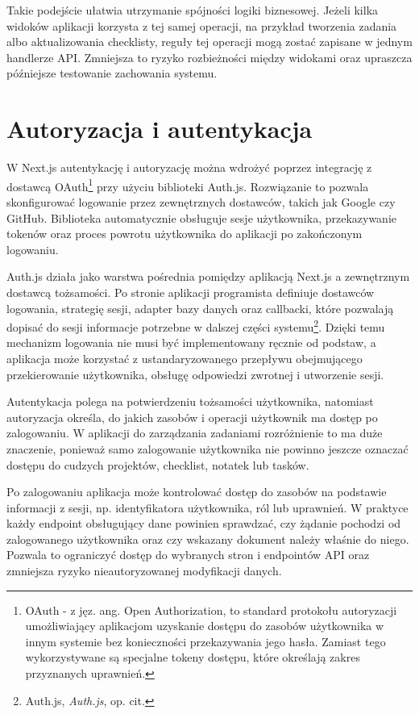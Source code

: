 \documentclass[12pt,a4paper,twoside]{report}
\newcommand{\FirstParagraph}{\noindent\ignorespaces}
\begin{document}
Takie podejście ułatwia utrzymanie spójności logiki biznesowej. Jeżeli kilka widoków aplikacji korzysta z tej samej operacji, na przykład tworzenia zadania albo aktualizowania checklisty, reguły tej operacji mogą zostać zapisane w jednym handlerze API. Zmniejsza to ryzyko rozbieżności między widokami oraz upraszcza późniejsze testowanie zachowania systemu.

\section{Autoryzacja i autentykacja}

\FirstParagraph W Next.js autentykację i autoryzację można wdrożyć poprzez integrację z dostawcą OAuth\footnote{OAuth - z jęz. ang. Open Authorization, to standard protokołu autoryzacji umożliwiający aplikacjom uzyskanie dostępu do zasobów użytkownika w innym systemie bez konieczności przekazywania jego hasła. Zamiast tego wykorzystywane są specjalne tokeny dostępu, które określają zakres przyznanych uprawnień.} przy użyciu biblioteki Auth.js. Rozwiązanie to pozwala skonfigurować logowanie przez zewnętrznych dostawców, takich jak Google czy GitHub. Biblioteka automatycznie obsługuje sesje użytkownika, przekazywanie tokenów oraz proces powrotu użytkownika do aplikacji po zakończonym logowaniu.

Auth.js działa jako warstwa pośrednia pomiędzy aplikacją Next.js a zewnętrznym dostawcą tożsamości. Po stronie aplikacji programista definiuje dostawców logowania, strategię sesji, adapter bazy danych oraz callbacki, które pozwalają dopisać do sesji informacje potrzebne w dalszej części systemu\footnote{Auth.js, \emph{Auth.js}, op. cit.}. Dzięki temu mechanizm logowania nie musi być implementowany ręcznie od podstaw, a aplikacja może korzystać z ustandaryzowanego przepływu obejmującego przekierowanie użytkownika, obsługę odpowiedzi zwrotnej i utworzenie sesji.

Autentykacja polega na potwierdzeniu tożsamości użytkownika, natomiast autoryzacja określa, do jakich zasobów i operacji użytkownik ma dostęp po zalogowaniu. W aplikacji do zarządzania zadaniami rozróżnienie to ma duże znaczenie, ponieważ samo zalogowanie użytkownika nie powinno jeszcze oznaczać dostępu do cudzych projektów, checklist, notatek lub tasków.

Po zalogowaniu aplikacja może kontrolować dostęp do zasobów na podstawie informacji z sesji, np. identyfikatora użytkownika, ról lub uprawnień. W praktyce każdy endpoint obsługujący dane powinien sprawdzać, czy żądanie pochodzi od zalogowanego użytkownika oraz czy wskazany dokument należy właśnie do niego. Pozwala to ograniczyć dostęp do wybranych stron i endpointów API oraz zmniejsza ryzyko nieautoryzowanej modyfikacji danych.
\end{document}

